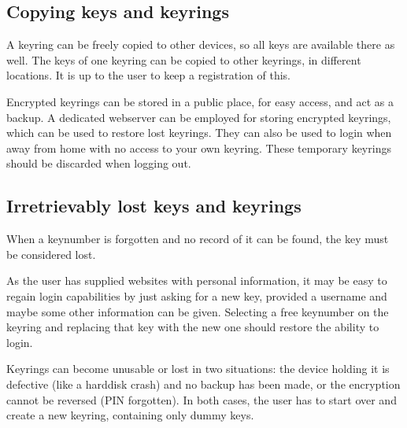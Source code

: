 \subsection{Copying keys and keyrings}
A keyring can be freely copied to other devices, so all keys are available there as well.
The keys of one keyring can be copied to other keyrings, in different locations.
It is up to the user to keep a registration of this.
\par
Encrypted keyrings can be stored in a public place, for easy access, and act as a backup.
A dedicated webserver can be employed for storing encrypted keyrings,
which can be used to restore lost keyrings.
They can also be used to login when away from home with no access to your own keyring.
These temporary keyrings should be discarded when logging out.

\subsection{Irretrievably lost keys and keyrings}
When a keynumber is forgotten and no record of it can be found,
the key must be considered lost.
\par
As the user has supplied websites with personal information,
it may be easy to regain login capabilities by just asking for a new key,
provided a username and maybe some other information can be given.
Selecting a free keynumber on the keyring and replacing that key with the new one should restore the ability to login.
\par
Keyrings can become unusable or lost in two situations:
the device holding it is defective (like a harddisk crash) and no backup has been made,
or the encryption cannot be reversed (PIN forgotten).
In both cases, the user has to start over and create a new keyring, containing only dummy keys.
